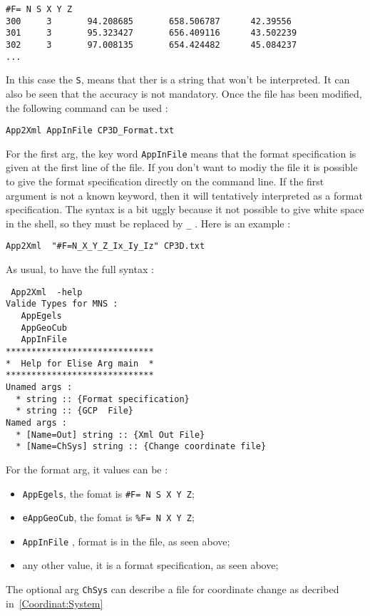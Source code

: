 \begin{verbatim}
#F= N S X Y Z
300     3       94.208685       658.506787      42.39556
301     3       95.323427       656.409116      43.502239
302     3       97.008135       654.424482      45.084237
...
\end{verbatim}

In this case  the {\tt S}, means that ther is a string that won't be interpreted. It can
also be seen that the accuracy is not mandatory.
Once the file has been modified, the following command can be used :

\begin{verbatim}
App2Xml AppInFile CP3D_Format.txt
\end{verbatim}

For the first arg, the key word {\tt AppInFile} means that the format specification is given
at the first line of the file. If you don't want to modiy the file it is possible to  
give the format specification directly on the command line. If the first argument is not
a known keyword, then it will tentatively interpreted as a format specification. The syntax
is a bit uggly because it not possible to give white space in the shell, so they must
be replaced by {\tt \_} . Here is an example :

\begin{verbatim}
App2Xml  "#F=N_X_Y_Z_Ix_Iy_Iz" CP3D.txt
\end{verbatim}

As usual, to have the full syntax :

\begin{verbatim}
 App2Xml  -help
Valide Types for MNS : 
   AppEgels
   AppGeoCub
   AppInFile
*****************************
*  Help for Elise Arg main  *
*****************************
Unamed args : 
  * string :: {Format specification}
  * string :: {GCP  File}
Named args : 
  * [Name=Out] string :: {Xml Out File}
  * [Name=ChSys] string :: {Change coordinate file}
\end{verbatim}


For the format arg, it values can be :

\begin{itemize}
   \item  {\tt AppEgels}, the fomat  is {\tt \#F= N S X Y Z};
   \item  {\tt eAppGeoCub}, the fomat  is {\tt \%F= N  X Y Z};
   \item  {\tt AppInFile} , format is in the file, as seen above;
   \item  any other value, it is a format specification, as seen above;
\end{itemize}

The optional arg {\tt ChSys} can describe a file for coordinate change as decribed 
in~\ref{Coordinat:System}


